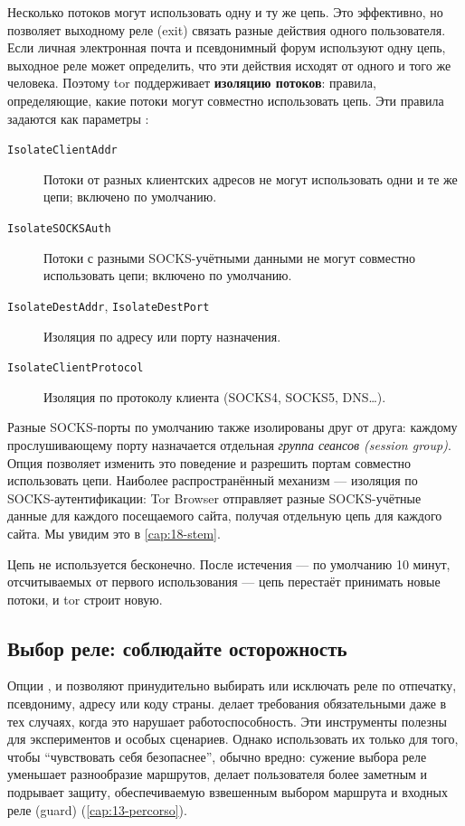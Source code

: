 Несколько потоков могут использовать одну и ту же цепь. Это эффективно, но позволяет выходному реле (exit) связать разные действия одного пользователя. Если личная электронная почта и псевдонимный форум используют одну цепь, выходное реле может определить, что эти действия исходят от одного и того же человека. Поэтому tor поддерживает \textbf{изоляцию потоков}: правила, определяющие, какие потоки могут совместно использовать цепь. Эти правила задаются как параметры :
\begin{description}
  \item[\texttt{IsolateClientAddr}] Потоки от разных клиентских адресов не могут использовать одни и те же цепи; включено по умолчанию.
  \item[\texttt{IsolateSOCKSAuth}] Потоки с разными SOCKS-учётными данными не могут совместно использовать цепи; включено по умолчанию.
  \item[\texttt{IsolateDestAddr}, \texttt{IsolateDestPort}] Изоляция по адресу или порту назначения.
  \item[\texttt{IsolateClientProtocol}] Изоляция по протоколу клиента (SOCKS4, SOCKS5, DNS\ldots).
\end{description}
Разные SOCKS-порты по умолчанию также изолированы друг от друга: каждому прослушивающему порту назначается отдельная \emph{группа сеансов (session group)}. Опция  позволяет изменить это поведение и разрешить портам совместно использовать цепи. Наиболее распространённый механизм — изоляция по SOCKS-аутентификации: Tor Browser отправляет разные SOCKS-учётные данные для каждого посещаемого сайта, получая отдельную цепь для каждого сайта. Мы увидим это в \cref{cap:18-stem}.

Цепь не используется бесконечно. После истечения  — по умолчанию 10 минут, отсчитываемых от первого использования — цепь перестаёт принимать новые потоки, и tor строит новую.

\subsection{Выбор реле: соблюдайте осторожность}

Опции ,  и  позволяют принудительно выбирать или исключать реле по отпечатку, псевдониму, адресу или коду страны.  делает требования  обязательными даже в тех случаях, когда это нарушает работоспособность. Эти инструменты полезны для экспериментов и особых сценариев. Однако использовать их только для того, чтобы \enquote{чувствовать себя безопаснее}, обычно вредно: сужение выбора реле уменьшает разнообразие маршрутов, делает пользователя более заметным и подрывает защиту, обеспечиваемую взвешенным выбором маршрута и входных реле (guard) (\cref{cap:13-percorso}).

